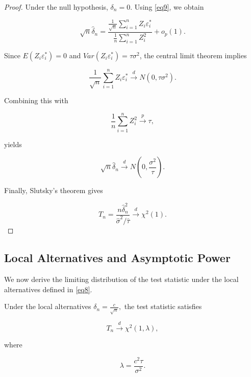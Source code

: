 \documentclass[twoside]{article}
\begin{document}
\begin{proof}
	Under the null hypothesis, $\delta_n=0$. Using \eqref{eq9}, we obtain
	
	\[
	\sqrt n\widehat{\delta}_n
	=
	\frac{
		\frac1{\sqrt n}
		\sum_{i=1}^{n}Z_i\varepsilon_i^*
	}{
		\frac1n
		\sum_{i=1}^{n}Z_i^2
	}
	+o_p(1).
	\]
	
	Since $E(Z_i\varepsilon_i^*)=0$ and $Var(Z_i\varepsilon_i^*)=\tau\sigma^2$, the central limit theorem implies
	
	\[
	\frac1{\sqrt n}
	\sum_{i=1}^{n}Z_i\varepsilon_i^*
	\xrightarrow{d}
	N(0,\tau\sigma^2).
	\]
	
	Combining this with
	
	\[
	\frac1n
	\sum_{i=1}^{n}Z_i^2
	\xrightarrow{p}
	\tau,
	\]
	
	yields
	
	\[
	\sqrt n\widehat{\delta}_n
	\xrightarrow{d}
	N\left(
	0,
	\frac{\sigma^2}{\tau}
	\right).
	\]
	
	Finally, Slutsky's theorem gives
	
	\[
	T_n
	=
	\frac{
		n\widehat{\delta}_n^2
	}{
		\widehat{\sigma}^2/\widehat{\tau}
	}
	\xrightarrow{d}
	\chi^2(1).
	\]
\end{proof}


\subsection{Local Alternatives and Asymptotic Power}

We now derive the limiting distribution of the test statistic under the local alternatives defined in \eqref{eq8}.


\begin{thm}\label{th2}
	Under the local alternatives
	$
	\delta_n=\frac{c}{\sqrt n},
	$
	the test statistic satisfies
	
	\[
	T_n
	\xrightarrow{d}
	\chi^2(1,\lambda),
	\]
	
	where
	
	\begin{equation}\label{eq12}
		\lambda
		=
		\frac{c^2\tau}{\sigma^2}.
	\end{equation}
\end{thm}
\end{document}
